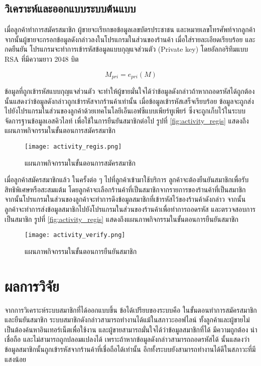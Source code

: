 \documentclass[12pt,a4paper,twocolumn]{article}
\begin{document}
\subsection{วิเคราะห์และออกแบบระบบต้นแบบ}
เมื่อลูกค้าทำการสมัครสมาชิก ผู้ขายจะเรียกขอข้อมูลเลขบัตรประชาชน และหมายเลขโทรศัพท์จากลูกค้า จากนั้นผู้ขายจะกรอกข้อมูลดังกล่าวลงในโปรแกรมในส่วนของร้านค้า เมื่อใส่รายละเอียดเรียบร้อย และกดยืนยัน โปรแกรมจะทำการเข้ารหัสข้อมูลแบบกุญแจส่วนตัว (Private key) โดยอัลกอริทึมแบบ RSA ที่มีความยาว 2048 บิต 

\begin{equation}M_{pri} = e_{pri}(M)\end{equation}

\noindent ข้อมูลที่ถูกเข้ารหัสแบบกุญแจส่วนตัว จะทำให้ผู้ขายมั่นใจได้ว่าข้อมูลดังกล่าวถ้าหากถอดรหัสได้ถูกต้อง นั้นแสดงว่าข้อมูลดังกล่าวถูกเข้ารหัสจากร้านค้าเท่านั้น เมื่อข้อมูลเข้ารหัสเสร็จเรียบร้อย ข้อมูลจะถูกส่งไปยังโปรแกรมในส่วนของลูกค้าด้วยเทคโนโลยีเอ็นเอฟซีแบบเพียร์ทูเพียร์ ซึ่งจะถูกเก็บไว้ในระบบจัดการฐานข้อมูลเอสคิวไลท์ เพื่อใช้ในการยืนยันสมาชิกต่อไป รูปที่ \ref{fig:activity_regis} แสดงถึงแผนภาพกิจกรรมในขั้นตอนการสมัครสมาชิก
\begin{figure}[ht!]
\centering
\texttt{[image: activity\_regis.png]}
\caption{แผนภาพกิจกรรมในขั้นตอนการสมัครสมาชิก} \label{fig:activity_regis}
\label{overflow}
\end{figure}

เมื่อลูกค้าสมัครสมาชิกแล้ว ในครั้งต่อ ๆ ไปที่ลูกค้าเข้ามาใช้บริการ ลูกค้าจะต้องยืนยันสมาชิกเพื่อรับสิทธิพิเศษหรือสะสมแต้ม โดยลูกค้าจะเลือกร้านค้าที่เป็นสมาชิกจากรายการของร้านค้าที่เป็นสมาชิก จากนั้นโปรแกรมในส่วนของลูกค้าจะทำการดึงข้อมูลสมาชิกที่เข้ารหัสไว้ของร้านค้าดังกล่าว จากนั้นลูกค้าจะทำการส่งข้อมูลสมาชิกไปยังโปรแกรมในส่วนของร้านค้าเพื่อทำการถอดรหัส และตรวจสอบการเป็นสมาชิก รูปที่ \ref{fig:activity_regis} แสดงถึงแผนภาพกิจกรรมในขั้นตอนการยืนยันสมาชิก
\begin{figure}[ht!]
\centering
\texttt{[image: activity\_verify.png]}
\caption{แผนภาพกิจกรรมในขั้นตอนการยืนยันสมาชิก} \label{fig:activity_verify}
\label{overflow}
\end{figure}


\section{ผลการวิจัย}
จากการวิเคราะห์ระบบสมาชิกที่ได้ออกแบบขึ้น ข้อได้เปรียบของระบบคือ ในขั้นตอนทำการสมัครสมาชิก และยืนยันสมาชิก ระบบสมาชิกดังกล่าวสามารถทำงานได้แม้ในสภาวะออฟไลน์ ทั้งลูกค้าและผู้ขายไม่เป็นต้องค้นหาอินเทอร์เน็ตเพื่อใช้งาน และผู้ขายสามารถมั่นใจได้ว่าข้อมูลสมาชิกที่ได้ มีความถูกต้อง น่าเชื่อถือ และไม่สามารถถูกปลอมแปลงได้ เพราะถ้าหากข้อมูลดังกล่าวสามารถถอดรหัสได้ นั้นแสดงว่าข้อมูลสมาชิกนั้นถูกเข้ารหัสจากร้านค้าที่เชื่อถือได้เท่านั้น อีกทั้งระบบยังสามารถทำงานได้ดีในสภาวะที่มีแสงน้อย
\end{document}
